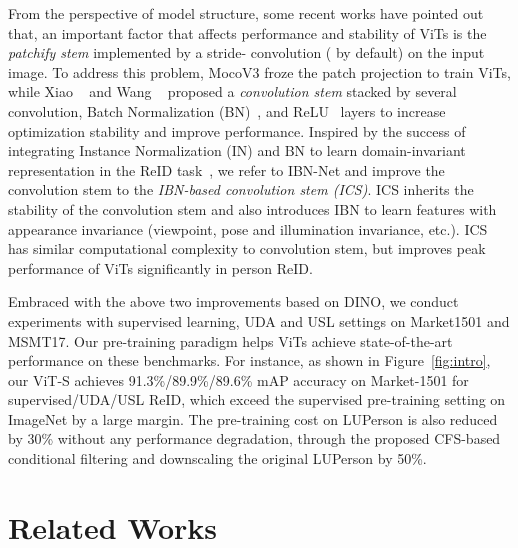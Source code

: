 \documentclass[10pt,twocolumn,letterpaper]{article}
\begin{document}
From the perspective of model structure, some recent works \cite{chen2021mocov3, conv_stem,wang2021scaled} have pointed out that, an important factor that affects performance and stability of ViTs is the \textit{patchify stem} implemented by a stride-  convolution ( by default) on the input image. To address this problem, MocoV3 \cite{chen2021mocov3} froze the patch projection to train ViTs, while Xiao \etal~\cite{conv_stem} and Wang \etal~\cite{wang2021scaled}  proposed a \textit{convolution stem} stacked by several convolution, Batch Normalization (BN)~\cite{bn}, and ReLU~\cite{relu} layers to increase optimization stability and improve  performance. Inspired by the success of integrating Instance Normalization (IN) and BN to learn domain-invariant representation in the ReID task~\cite{BoT, ibnnet, dai2021cluster}, we refer to IBN-Net \cite{ibnnet} and improve the convolution stem to the \textit{IBN-based convolution stem (ICS)}. ICS inherits the stability of the convolution stem and also introduces IBN to learn features with appearance invariance (\eg viewpoint, pose and illumination invariance, etc.). ICS has similar computational complexity to convolution stem, but improves peak performance of ViTs significantly in person ReID.


Embraced with the above two improvements based on DINO, we conduct experiments with supervised learning, UDA and USL settings on Market1501 and MSMT17. Our pre-training paradigm helps ViTs achieve state-of-the-art performance on these benchmarks. For instance, as shown in Figure~\ref{fig:intro}, our ViT-S achieves 91.3\%/89.9\%/89.6\% mAP accuracy on Market-1501 for supervised/UDA/USL ReID, which exceed the supervised pre-training setting on ImageNet by a large margin. The pre-training cost on LUPerson is also reduced by 30\% without any performance degradation, through the proposed CFS-based conditional filtering and downscaling the original LUPerson by 50\%. 





\section{Related Works}
\end{document}
